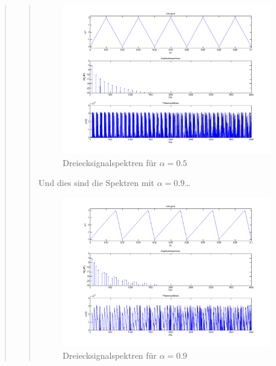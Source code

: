 \begin{quote}
\begin{quote}
\begin{center}
	           \begin{figure}[H]
    			\centering
    				\includegraphics[scale=0.5]{drei_alpha5.png}
    			\caption{Dreiecksignalspektren für $\alpha = 0.5$}
    			\end{figure}		
		
		\end{center}
		
		\vspace{1em}
		
		Und dies sind die Spektren mit $\alpha = 0.9$\ldots
		
		\begin{center}
	    
	           \begin{figure}[H]
    			\centering
    				\includegraphics[scale=0.5]{drei_alpha9.png}
    				\caption{Dreiecksignalspektren für $\alpha = 0.9$}
    			\end{figure}		
		

\end{center}
\end{quote}
\end{quote}
